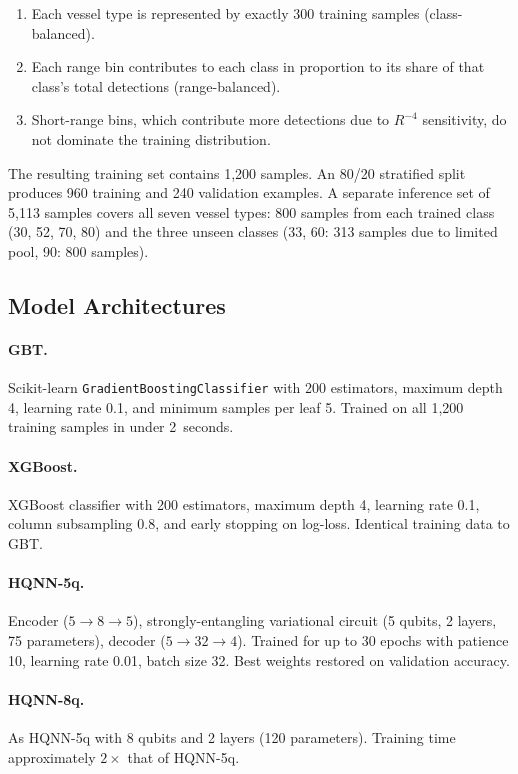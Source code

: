 \documentclass[journal]{IEEEtran}
\begin{document}
\begin{enumerate}
  \item Each vessel type is represented by exactly 300 training samples
        (class-balanced).
  \item Each range bin contributes to each class in proportion to its
        share of that class's total detections (range-balanced).
  \item Short-range bins, which contribute more detections due to
        $R^{-4}$ sensitivity, do not dominate the training distribution.
\end{enumerate}

The resulting training set contains 1,200 samples. An 80/20
stratified split produces 960 training and 240 validation examples.
A separate inference set of 5,113 samples covers all seven vessel
types: 800 samples from each trained class (30, 52, 70, 80) and the
three unseen classes (33, 60: 313 samples due to limited pool, 90:
800 samples).

\subsection{Model Architectures}

\paragraph{GBT.} Scikit-learn \texttt{GradientBoostingClassifier} with
200 estimators, maximum depth 4, learning rate 0.1, and minimum samples
per leaf 5. Trained on all 1,200 training samples in under 2~seconds.

\paragraph{XGBoost.} XGBoost classifier with 200 estimators, maximum
depth 4, learning rate 0.1, column subsampling 0.8, and early stopping
on log-loss. Identical training data to GBT.

\paragraph{HQNN-5q.} Encoder ($5 \to 8 \to 5$), strongly-entangling
variational circuit (5 qubits, 2 layers, 75 parameters), decoder
($5 \to 32 \to 4$). Trained for up to 30 epochs with patience 10,
learning rate 0.01, batch size 32. Best weights restored on validation
accuracy.

\paragraph{HQNN-8q.} As HQNN-5q with 8 qubits and 2 layers (120
parameters). Training time approximately $2\times$ that of HQNN-5q.
\end{document}
